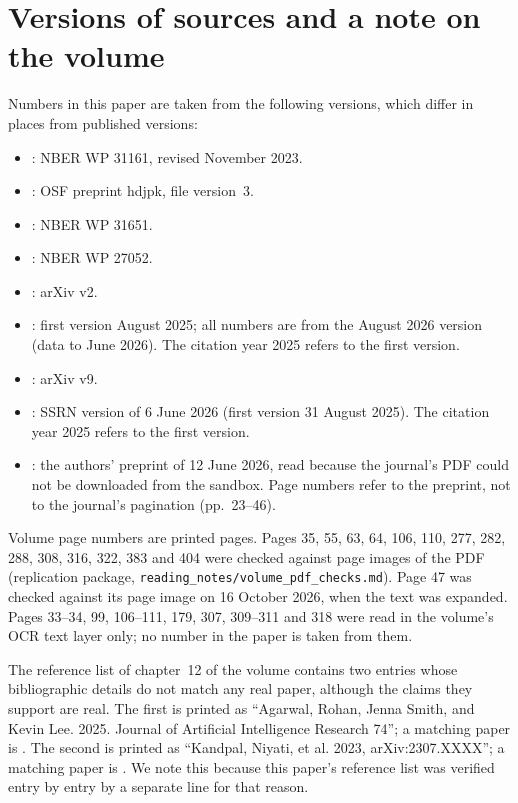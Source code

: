 \documentclass[12pt]{article}
\theoremstyle{remark}
\begin{document}
\section{Versions of sources and a note on the volume}\label{app:versions}\label{app:volume}
Numbers in this paper are taken from the following versions, which differ in places from published versions:
\begin{itemize}[itemsep=0pt]
\item \citet{brynjolfsson2025work}: NBER WP 31161, revised November 2023.
\item \citet{otis2026uneven}: OSF preprint hdjpk, file version~3.
\item \citet{dube2025policing}: NBER WP 31651.
\item \citet{acemoglu2020tax}: NBER WP 27052.
\item \citet{steyvers2025know}: arXiv v2.
\item \citet{brynjolfsson2025canaries}: first version August 2025; all numbers are from the August 2026 version (data to June 2026). The citation year 2025 refers to the first version.
\item \citet{ide2025automation}: arXiv v9.
\item \citet{hosseini2025seniority}: SSRN version of 6 June 2026 (first version 31 August 2025). The citation year 2025 refers to the first version.
\item \citet{demirer2026market}: the authors' preprint of 12 June 2026, read because the journal's PDF could not be downloaded from the sandbox. Page numbers refer to the preprint, not to the journal's pagination (pp.~23--46).
\end{itemize}
Volume page numbers are printed pages. Pages 35, 55, 63, 64, 106, 110, 277, 282, 288, 308, 316, 322, 383 and 404 were checked against page images of the PDF (replication package, \texttt{reading\_notes/volume\_pdf\_checks.md}). Page 47 was checked against its page image on 16 October 2026, when the text was expanded. Pages 33--34, 99, 106--111, 179, 307, 309--311 and 318 were read in the volume's OCR text layer only; no number in the paper is taken from them.

The reference list of chapter~12 of the volume contains two entries whose bibliographic details do not match any real paper, although the claims they support are real. The first is printed as ``Agarwal, Rohan, Jenna Smith, and Kevin Lee. 2025. Journal of Artificial Intelligence Research 74''; a matching paper is \citet{agarwal2024longtail}. The second is printed as ``Kandpal, Niyati, et al. 2023, arXiv:2307.XXXX''; a matching paper is \citet{kandpal2023longtail}. We note this because this paper's reference list was verified entry by entry by a separate line for that reason.
\end{document}
